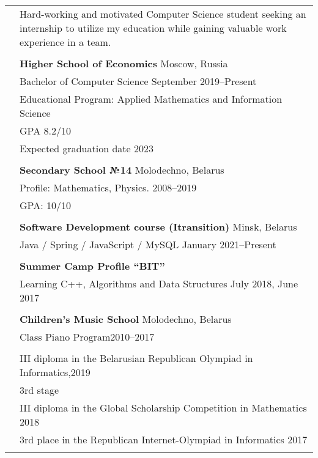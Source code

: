 \documentclass[letterpaper, 11pt]{article}
\begin{document}
\begin{longtable}{p{1.3in}p{4.8in}}


\nohyphens{\color{OliveGreen}{Objective}}
& Hard-working and motivated Computer Science student seeking an internship to utilize my
education while gaining valuable work experience in a team. \\
& \\


\color{OliveGreen}{Education} 
& \textbf{Higher School of Economics} \hfill Moscow, Russia \\ 
& Bachelor of Computer Science \hfill September 2019--Present \\
& Educational Program: Applied Mathematics and Information Science\\
& GPA 8.2/10 \\
& Expected graduation date 2023 \\
& \\

& \textbf{Secondary School №14} \hfill Molodechno, Belarus \\
& Profile: Mathematics, Physics. \hfill 2008--2019\\
& GPA: 10/10 \\
& \\



{\color{OliveGreen}{Additional}}
& \textbf{Software Development course (Itransition)} \hfill Minsk, Belarus\\
{\color{OliveGreen}{Education}} 
& Java / Spring / JavaScript / MySQL \hfill January 2021--Present\\
& \\

& \textbf{Summer Camp Profile “BIT”} \\
& Learning C++, Algorithms and Data Structures \hfill July 2018, June 2017 \\
& \\

& \textbf{Children’s Music School} \hfill Molodechno, Belarus\\
& Class Piano Program\hfill 2010--2017\\
& \\


{\color{OliveGreen}{Aware and}} 
& III diploma in the Belarusian Republican Olympiad in Informatics,\hfill 2019\\
{\color{OliveGreen}{achievements}} 
& 3rd stage \\
& III diploma in the Global Scholarship Competition in Mathematics \hfill 2018\\
& 3rd place in the Republican Internet-Olympiad in Informatics  \hfill 2017\\
& \\


\end{longtable}
\end{document}
